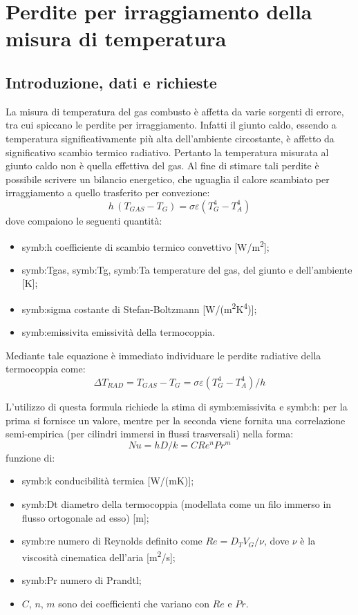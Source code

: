 \section{Perdite per irraggiamento della misura di temperatura}
\subsection{Introduzione, dati e richieste}
La misura di temperatura del gas combusto è affetta da varie sorgenti di errore, tra cui spiccano le perdite per irraggiamento. 
Infatti il giunto caldo, essendo a temperatura significativamente più alta dell'ambiente circostante, è affetto da significativo scambio termico radiativo. Pertanto la temperatura misurata al giunto caldo non è quella effettiva del gas. 
Al fine di stimare tali perdite è possibile scrivere un bilancio energetico, che uguaglia il calore scambiato per irraggiamento a quello trasferito per convezione: 
\begin{equation}
	h \,(T_{\textit{GAS}}-T_G) = \sigma \varepsilon (T_G^4-T_A^4)
\end{equation}
dove compaiono le seguenti quantità:
\begin{itemize}
	\item \gls{symb:h} coefficiente di scambio termico convettivo [W/m\textsuperscript{2}];
	\item \gls{symb:Tgas}, \gls{symb:Tg}, \gls{symb:Ta} temperature del gas, del giunto e dell'ambiente [K];
	\item \gls{symb:sigma} costante di Stefan-Boltzmann [W/(m\textsuperscript{2}K\textsuperscript{4})];
	\item \gls{symb:emissivita} emissività della termocoppia.
\end{itemize}

Mediante tale equazione è immediato individuare le perdite radiative della termocoppia come:
\begin{equation}
	\Delta T_{\textit{RAD}} = T_{\textit{GAS}} -T_G = \sigma \varepsilon (T_G^4-T_A^4) / h \label{eq:deltaT}
\end{equation}

L'utilizzo di questa formula richiede la stima di \gls{symb:emissivita} e \gls{symb:h}: per la prima si fornisce un valore, mentre per la seconda viene fornita una correlazione semi-empirica (per cilindri immersi in flussi trasversali) nella forma:
\begin{equation}
	Nu = hD/k = CRe^nPr^m
\end{equation}
funzione di:
\begin{itemize}
	\item \gls{symb:k} conducibilità termica [W/(mK)];
	\item \gls{symb:Dt} diametro della termocoppia (modellata come un filo immerso in flusso ortogonale ad esso) [m];
	\item \gls{symb:re} numero di Reynolds definito come $Re = D_T V_G/\nu$, dove $\nu$ è la viscosità cinematica dell'aria [m\textsuperscript{2}/s];
	\item \gls{symb:Pr} numero di Prandtl;
	\item $C$, $n$, $m$ sono dei coefficienti che variano con $Re$ e $Pr$.
\end{itemize}

